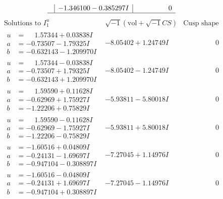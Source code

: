 \documentclass[1p]{elsarticle_modified}
\theoremstyle{definition}
\newcommand{\I}{\sqrt{-1}}
\begin{document}
$$\begin{array}{c|c|c}
 & -1.346100 - 0.385297 I & \phantom{-0.000000 } 0\\
 \hline 
 \end{array}$$\newpage$$\begin{array}{c|c|c}  
\text{Solutions to }I^u_{1}& \I (\text{vol} + \sqrt{-1}CS) & \text{Cusp shape}\\
 \hline 
\begin{aligned}
u &= \phantom{-}1.57344 + 0.03838 I \\
a &= -0.73507 - 1.79325 I \\
b &= -0.632143 - 1.209970 I\end{aligned}
 & -8.05402 + 1.24749 I & \phantom{-0.000000 } 0 \\ \hline\begin{aligned}
u &= \phantom{-}1.57344 - 0.03838 I \\
a &= -0.73507 + 1.79325 I \\
b &= -0.632143 + 1.209970 I\end{aligned}
 & -8.05402 - 1.24749 I & \phantom{-0.000000 } 0 \\ \hline\begin{aligned}
u &= \phantom{-}1.59590 + 0.11628 I \\
a &= -0.62969 + 1.75927 I \\
b &= -1.22206 + 0.75829 I\end{aligned}
 & -5.93811 - 5.80018 I & \phantom{-0.000000 } 0 \\ \hline\begin{aligned}
u &= \phantom{-}1.59590 - 0.11628 I \\
a &= -0.62969 - 1.75927 I \\
b &= -1.22206 - 0.75829 I\end{aligned}
 & -5.93811 + 5.80018 I & \phantom{-0.000000 } 0 \\ \hline\begin{aligned}
u &= -1.60516 + 0.04809 I \\
a &= -0.24131 - 1.69697 I \\
b &= -0.947104 - 0.308897 I\end{aligned}
 & -7.27045 + 1.14976 I & \phantom{-0.000000 } 0 \\ \hline\begin{aligned}
u &= -1.60516 - 0.04809 I \\
a &= -0.24131 + 1.69697 I \\
b &= -0.947104 + 0.308897 I\end{aligned}
 & -7.27045 - 1.14976 I & \phantom{-0.000000 } 0 \\ \hline\begin{aligned}

\end{aligned}
\end{array}$$
\end{document}
